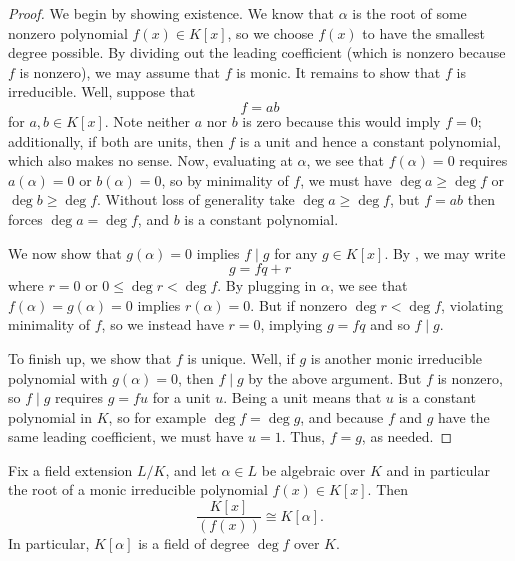 \documentclass[../notes.tex]{subfiles}
\begin{document}
\begin{proof}
	We begin by showing existence. We know that $\alpha$ is the root of some nonzero polynomial $f(x)\in K[x]$, so we choose $f(x)$ to have the smallest degree possible. By dividing out the leading coefficient (which is nonzero because $f$ is nonzero), we may assume that $f$ is monic. It remains to show that $f$ is irreducible. Well, suppose that
	\[f=ab\]
	for $a,b\in K[x]$. Note neither $a$ nor $b$ is zero because this would imply $f=0$; additionally, if both are units, then $f$ is a unit and hence a constant polynomial, which also makes no sense. Now, evaluating at $\alpha$, we see that $f(\alpha)=0$ requires $a(\alpha)=0$ or $b(\alpha)=0$, so by minimality of $f$, we must have $\deg a\ge\deg f$ or $\deg b\ge\deg f$. Without loss of generality take $\deg a\ge\deg f$, but $f=ab$ then forces $\deg a=\deg f$, and $b$ is a constant polynomial.

	We now show that $g(\alpha)=0$ implies $f\mid g$ for any $g\in K[x]$. By , we may write
	\[g=fq+r\]
	where $r=0$ or $0\le\deg r<\deg f$. By plugging in $\alpha$, we see that $f(\alpha)=g(\alpha)=0$ implies $r(\alpha)=0$. But if nonzero $\deg r<\deg f$, violating minimality of $f$, so we instead have $r=0$, implying $g=fq$ and so $f\mid g$.

	To finish up, we show that $f$ is unique. Well, if $g$ is another monic irreducible polynomial with $g(\alpha)=0$, then $f\mid g$ by the above argument. But $f$ is nonzero, so $f\mid g$ requires $g=fu$ for a unit $u$. Being a unit means that $u$ is a constant polynomial in $K$, so for example $\deg f=\deg g$, and because $f$ and $g$ have the same leading coefficient, we must have $u=1$. Thus, $f=g$, as needed.
\end{proof}
\begin{lemma} \label{lem:quotient-of-poly-ring}
	Fix a field extension $L/K$, and let $\alpha\in L$ be algebraic over $K$ and in particular the root of a monic irreducible polynomial $f(x)\in K[x]$. Then
	\[\frac{K[x]}{(f(x))}\cong K[\alpha].\]
	In particular, $K[\alpha]$ is a field of degree $\deg f$ over $K$.
\end{lemma}
\end{document}
